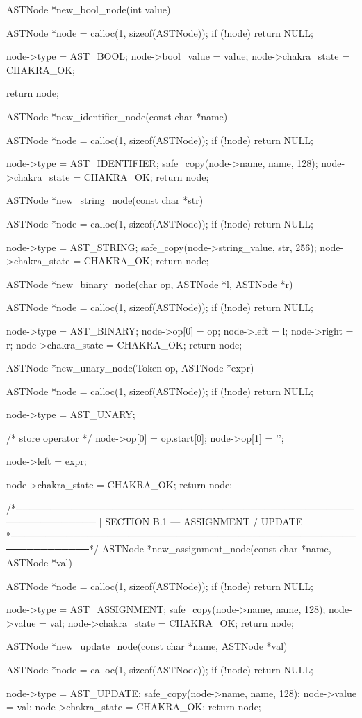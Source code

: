 \documentclass{article}
\begin{document}
ASTNode *new_bool_node(int value)
{
    ASTNode *node = calloc(1, sizeof(ASTNode));
    if (!node) return NULL;

    node->type = AST_BOOL;
    node->bool_value = value;
    node->chakra_state = CHAKRA_OK;

    return node;
}

ASTNode *new_identifier_node(const char *name)
{
    ASTNode *node = calloc(1, sizeof(ASTNode));
    if (!node) return NULL;

    node->type = AST_IDENTIFIER;
    safe_copy(node->name, name, 128);
    node->chakra_state = CHAKRA_OK;
    return node;
}

ASTNode *new_string_node(const char *str)
{
    ASTNode *node = calloc(1, sizeof(ASTNode));
    if (!node) return NULL;

    node->type = AST_STRING;
    safe_copy(node->string_value, str, 256);
    node->chakra_state = CHAKRA_OK;
    return node;
}

ASTNode *new_binary_node(char op, ASTNode *l, ASTNode *r)
{
    ASTNode *node = calloc(1, sizeof(ASTNode));
    if (!node) return NULL;

    node->type = AST_BINARY;
    node->op[0] = op;
    node->left = l;
    node->right = r;
    node->chakra_state = CHAKRA_OK;
    return node;
}

ASTNode *new_unary_node(Token op, ASTNode *expr)
{
    ASTNode *node = calloc(1, sizeof(ASTNode));
    if (!node) return NULL;

    node->type = AST_UNARY;

    /* store operator */
    node->op[0] = op.start[0];
    node->op[1] = '\0';

    node->left = expr;

    node->chakra_state = CHAKRA_OK;
    return node;
}
/*──────────────────────────────────────────────────────────────
 | SECTION B.1 — ASSIGNMENT / UPDATE
 *──────────────────────────────────────────────────────────────*/
ASTNode *new_assignment_node(const char *name, ASTNode *val)
{
    ASTNode *node = calloc(1, sizeof(ASTNode));
    if (!node) return NULL;

    node->type = AST_ASSIGNMENT;
    safe_copy(node->name, name, 128);
    node->value = val;
    node->chakra_state = CHAKRA_OK;
    return node;
}

ASTNode *new_update_node(const char *name, ASTNode *val)
{
    ASTNode *node = calloc(1, sizeof(ASTNode));
    if (!node) return NULL;

    node->type = AST_UPDATE;
    safe_copy(node->name, name, 128);
    node->value = val;
    node->chakra_state = CHAKRA_OK;
    return node;
}
\end{document}
